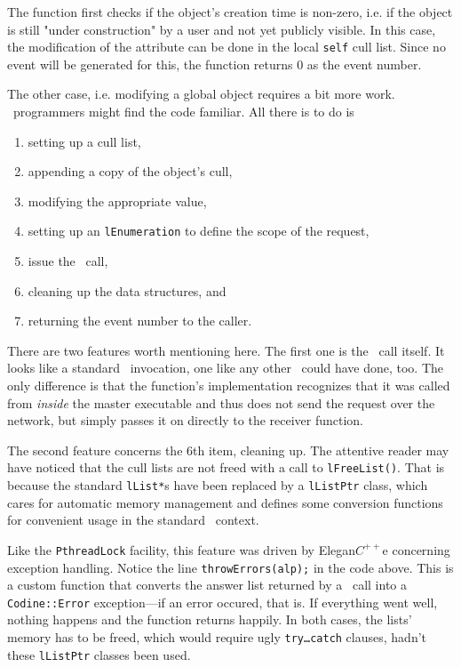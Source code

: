 The function first checks if the object's creation time is non-zero, i.e. if
the object is still "under construction" by a user and not yet publicly
visible. In this case, the modification of the attribute can be done in the
local \texttt{self} cull list. Since no event will be generated for this,
the function returns 0 as the event number.

The other case, i.e. modifying a global object requires a bit more work.
\codapi\ programmers might find the code familiar. All there is to do is
\begin{enumerate}
\item setting up a cull list,
\item appending a copy of the object's cull,
\item modifying the appropriate value,
\item setting up an \texttt{lEnumeration} to define the scope of the request,
\item issue the \codapi\ call, 
\item cleaning up the data structures, and
\item returning the event number to the caller.
\end{enumerate}

There are two features worth mentioning here. The first one is the \codapi\
call itself. It looks like a standard \codapi\ invocation, one like any other
\codapi\ could have done, too. The only difference is that the function's
implementation recognizes that it was called from \emph{inside} the master
executable and thus does not send the request over the network, but simply
passes it on directly to the receiver function.

The second feature concerns the 6th item, cleaning up. The attentive reader
may have noticed that the cull lists are not freed with a call to
\texttt{lFreeList()}. That is because the standard \texttt{lList*}s have been
replaced by a \texttt{lListPtr} class, which cares for automatic memory
management and defines some conversion functions for convenient usage in the
standard \codapi\ context.

Like the \texttt{PthreadLock} facility, this feature was driven by 
Elegan$C^{++}$e concerning exception handling. Notice the line
\texttt{throwErrors(alp);} in the code above. This is a custom function that
converts the answer list returned by a \codapi\ call into a
\texttt{Codine::Error} exception---if an error occured, that is. If
everything went well, nothing happens and the function returns happily. In
both cases, the lists' memory has to be freed, which would require ugly
\texttt{try\dots catch} clauses, hadn't these \texttt{lListPtr} classes been
used.

